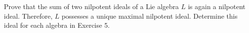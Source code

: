 Prove that the sum of two nilpotent ideals of a Lie algebra $L$ is again a nilpotent ideal. Therefore, $L$ possesses a unique maximal nilpotent ideal. Determine this ideal for each algebra in Exercise 5.
